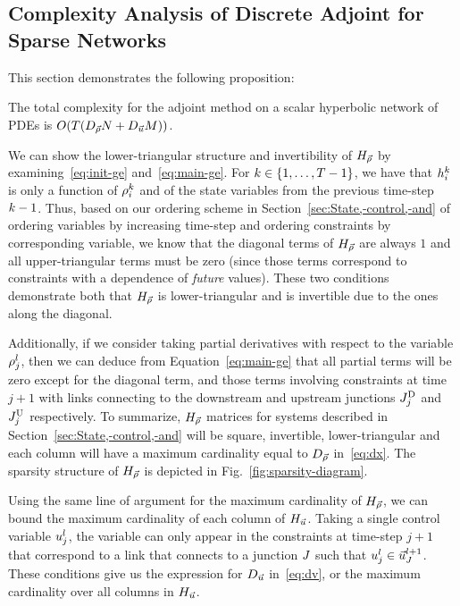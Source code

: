 \subsection{Complexity Analysis of Discrete Adjoint for Sparse Networks}
\label{sub:Complexity-of-solving}

This section demonstrates the following proposition:

\begin{prop}
\textup{The total complexity for the adjoint method on a scalar hyperbolic
network of PDEs is }$O(\ntime\left(\DegreeSymbol{\state}\nlinks+\DegreeSymbol{\control}\ncontrols\right))$.\end{prop}

We can show the lower-triangular structure and invertibility of $H_{\vec{\rho}}$
by examining~\eqref{eq:init-ge} and~\eqref{eq:main-ge}. For $\tind\in\intrange 1{\ntime-1}$,
we have that $h_{i}^{k}$ is only a function of $\rho_{i}^{k}$
and of the state variables from the previous time-step $k-1$.
Thus, based on our ordering scheme in Section~\ref{sec:State,-control,-and}
of ordering variables by increasing time-step and ordering constraints
by corresponding variable, we know that the diagonal terms of $H_{\vec{\rho}}$ are
always $1$ and all upper-triangular terms must be zero (since those
terms correspond to constraints with a dependence of \emph{future}
values). These two conditions demonstrate both that $H_{\vec{\rho}}$ is lower-triangular
and is invertible due to the ones along the diagonal.

Additionally, if we consider taking partial derivatives with respect
to the variable $\rho_{j}^{l}$, then we can deduce from Equation~\eqref{eq:main-ge}
that all partial terms will be zero except for the diagonal term,
and those terms involving constraints at time $j+1$ with links connecting
to the downstream and upstream junctions $J_{j}^{\text{D}}$ and $J_{j}^{\text{U}}$
respectively. To summarize, $H_{\vec{\rho}}$ matrices for systems described
in Section~\ref{sec:State,-control,-and} will be square, invertible,
lower-triangular and each column will have a maximum cardinality equal
to $D_{\vec{\rho}}$ in~\eqref{eq:dx}. The sparsity structure of
$H_{\vec{\rho}}$ is depicted in Fig.~\ref{fig:sparsity-diagram}.

Using the same line of argument for the maximum cardinality of $H_{\vec{\rho}}$,
we can bound the maximum cardinality of each column of $H_{\vec{u}}$. Taking
a single control variable $u_{j}^{l}$, the variable can only
appear in the constraints at time-step $j+1$ that correspond to a link
that connects to a junction $J$ such that $u_{j}^{l}\in\vec{u}_{J}^{l+1}$.
These conditions give us the expression for $D_{\vec{u}}$ in~\eqref{eq:dv},
or the maximum cardinality over all columns in $H_{\vec{u}}$.

